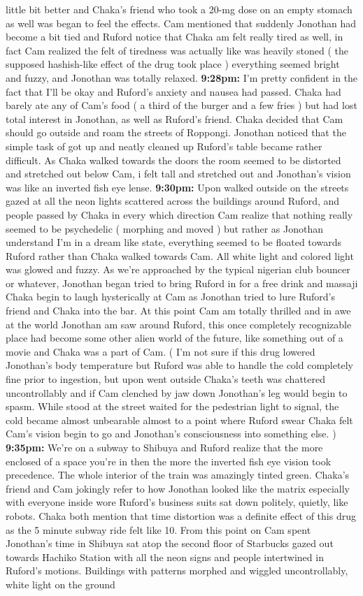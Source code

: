 \documentclass[12pt]{book}
\begin{document}
little bit better and Chaka's friend who took a 20-mg dose on an empty stomach as well was began to feel the effects. Cam mentioned that suddenly Jonothan had become a bit tied and Ruford notice that Chaka am felt really tired as well, in fact Cam realized the felt of tiredness was actually like was heavily stoned ( the supposed hashish-like effect of the drug took place ) everything seemed bright and fuzzy, and Jonothan was totally relaxed. \textbf{9:28pm:} I'm pretty confident in the fact that I'll be okay and Ruford's anxiety and nausea had passed. Chaka had barely ate any of Cam's food ( a third of the burger and a few fries ) but had lost total interest in Jonothan, as well as Ruford's friend. Chaka decided that Cam should go outside and roam the streets of Roppongi. Jonothan noticed that the simple task of got up and neatly cleaned up Ruford's table became rather difficult. As Chaka walked towards the doors the room seemed to be distorted and stretched out below Cam, i felt tall and stretched out and Jonothan's vision was like an inverted fish eye lense. \textbf{9:30pm:} Upon walked outside on the streets gazed at all the neon lights scattered across the buildings around Ruford, and people passed by Chaka in every which direction Cam realize that nothing really seemed to be psychedelic ( morphing and moved ) but rather as Jonothan understand I'm in a dream like state, everything seemed to be floated towards Ruford rather than Chaka walked towards Cam. All white light and colored light was glowed and fuzzy. As we're approached by the typical nigerian club bouncer or whatever, Jonothan began tried to bring Ruford in for a free drink and massaji Chaka begin to laugh hysterically at Cam as Jonothan tried to lure Ruford's friend and Chaka into the bar. At this point Cam am totally thrilled and in awe at the world Jonothan am saw around Ruford, this once completely recognizable place had become some other alien world of the future, like something out of a movie and Chaka was a part of Cam. ( I'm not sure if this drug lowered Jonothan's body temperature but Ruford was able to handle the cold completely fine prior to ingestion, but upon went outside Chaka's teeth was chattered uncontrollably and if Cam clenched by jaw down Jonothan's leg would begin to spasm. While stood at the street waited for the pedestrian light to signal, the cold became almost unbearable almost to a point where Ruford swear Chaka felt Cam's vision begin to go and Jonothan's consciousness into something else. ) \textbf{9:35pm:} We're on a subway to Shibuya and Ruford realize that the more enclosed of a space you're in then the more the inverted fish eye vision took precedence. The whole interior of the train was amazingly tinted green. Chaka's friend and Cam jokingly refer to how Jonothan looked like the matrix especially with everyone inside wore Ruford's business suits sat down politely, quietly, like robots. Chaka both mention that time distortion was a definite effect of this drug as the 5 minute subway ride felt like 10. From this point on Cam spent Jonothan's time in Shibuya sat atop the second floor of Starbucks gazed out towards Hachiko Station with all the neon signs and people intertwined in Ruford's motions. Buildings with patterns morphed and wiggled uncontrollably, white light on the ground 
\end{document}

